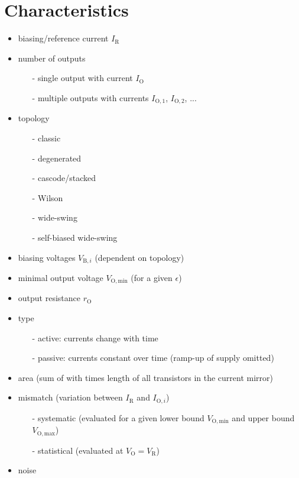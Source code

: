 \documentclass{article}[11pt]
\begin{document}
\notetitle

\section{Characteristics}

\begin{itemize}
  \item biasing/reference current $I_{\mathrm{R}}$
  
  \item number of outputs
    \begin{itemize}
      \item[-] single output with current $I_{\mathrm{O}}$
      \item[-] multiple outputs with currents $I_{\mathrm{O,1}}$, $I_{\mathrm{O,2}}$, ...
    \end{itemize}

  \item topology
    \begin{itemize}
      \item[-] classic
      \item[-] degenerated
      \item[-] cascode/stacked 
      \item[-] Wilson 
      \item[-] wide-swing
      \item[-] self-biased wide-swing
    \end{itemize}

  \item  biasing voltages $V_{\mathrm{B,}i}$ (dependent on topology)

  \item minimal output voltage $V_{\mathrm{O,min}}$ (for a given $\epsilon$)

  \item output resistance $r_{\mathrm{O}}$

  \item type
    \begin{itemize}
      \item[-] active: currents change with time
      \item[-] passive: currents constant over time (ramp-up of supply omitted)  
    \end{itemize}

  \item area (sum of with times length of all transistors in the current mirror)

  \item mismatch (variation between $I_{\mathrm{R}}$ and $I_{\mathrm{O,}i}$)
    \begin{itemize}
      \item[-] systematic (evaluated for a given lower bound $V_{\mathrm{O,min}}$ and upper bound $V_{\mathrm{O,max}}$)
      \item[-] statistical (evaluated at $V_{\mathrm{O}}=V_{\mathrm{R}}$)
    \end{itemize}
  \item noise
\end{itemize}
\end{document}
